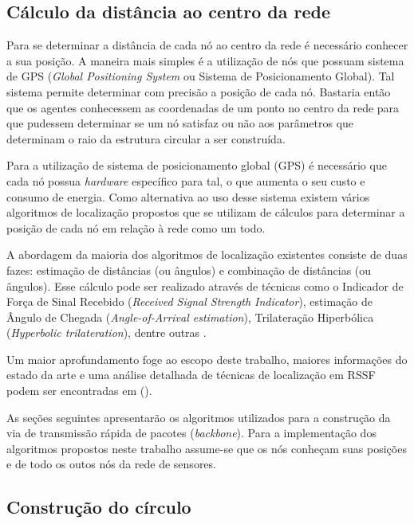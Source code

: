 \subsection{Cálculo da distância ao centro da rede}
\label{sec:calculoDistancia}

Para se determinar a distância de cada nó ao centro da rede é necessário conhecer a sua posição. A maneira mais simples é a utilização de nós que possuam sistema de GPS (\emph{Global Positioning System} ou Sistema de Posicionamento Global). Tal sistema permite determinar com precisão a posição de cada nó. Bastaria então que os agentes conhecessem as coordenadas de um ponto no centro da rede para que pudessem determinar se um nó satisfaz ou não aos parâmetros que determinam o raio da estrutura circular a ser construída.

Para a utilização de sistema de posicionamento global (GPS) é necessário que cada nó possua \emph{hardware} específico para tal, o que aumenta o seu custo e consumo de energia. Como alternativa ao uso desse sistema existem vários algoritmos de localização propostos que se utilizam de cálculos para determinar a posição de cada nó em relação à rede como um todo.

A abordagem da maioria dos algoritmos de localização existentes consiste de duas fazes: estimação de distâncias (ou ângulos) e combinação de distâncias (ou ângulos). Esse cálculo pode ser realizado através de técnicas como o Indicador de Força de Sinal Recebido (\emph{Received Signal Strength Indicator}), estimação de Ângulo de Chegada (\emph{Angle-of-Arrival estimation}), Trilateração Hiperbólica (\emph{Hyperbolic trilateration}), dentre outras \cite{Pal2010}. 

Um maior aprofundamento foge ao escopo deste trabalho, maiores informações do estado da arte e uma análise detalhada de técnicas de localização em RSSF podem ser encontradas em  (\citeyear{Pal2010}). 

As seções seguintes apresentarão os algoritmos utilizados para a construção da via de transmissão rápida de pacotes (\emph{backbone}). Para a implementação dos algoritmos propostos neste trabalho assume-se que os nós conheçam suas posições e de todo os outos nós da rede de sensores.

\subsection{Construção do círculo}
\label{sec:circleBuilding}

